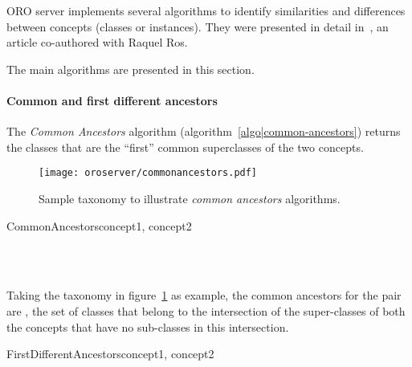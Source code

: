 ORO server implements several algorithms to identify similarities and
differences between concepts (classes or instances). They were presented in
detail in~\cite{Ros2010b}, an article co-authored with Raquel Ros.

The main algorithms are presented in this section.

\paragraph{Common and first different ancestors} The \emph{Common Ancestors}
algorithm (algorithm~\ref{algo|common-ancestors}) returns the classes that
are the ``first'' common superclasses of the two concepts.

\begin{figure}
    \centering
    \texttt{[image: oroserver/commonancestors.pdf]}
    \caption{Sample taxonomy to illustrate \emph{common ancestors} algorithms.}
    \label{fig|common-ancestors}
\end{figure}

\small
\begin{pseudocode}[ruled]{CommonAncestors}{concept1, concept2}
\label{algo|common-ancestors}

\BEGIN
{} \GETS {} \cap {} \\
\\
\END

\end{pseudocode}
\normalsize

Taking the taxonomy in figure~\ref{fig|common-ancestors} as example, the common
ancestors for the pair  are
, \ie the set of classes that belong to
the intersection of the super-classes of both the concepts that have no
sub-classes in this intersection.

\small
\begin{pseudocode}[ruled]{FirstDifferentAncestors}{concept1, concept2}
\label{algo|first-different-ancestors}

\BEGIN
{} \GETS {} \\
 \GETS {} \cup {} \\

 \\
\END

\end{pseudocode}
\normalsize


